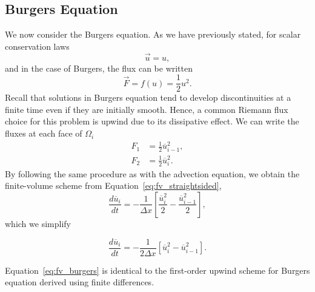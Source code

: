 \subsection{Burgers Equation}
We now consider the Burgers equation. As we have previously stated, for scalar conservation laws
\begin{equation}
 \vec{u} = u,
\end{equation}
and in the case of Burgers, the flux can be written
\begin{equation}
 \vec{F} = f(u) = \frac{1}{2} u^2.
\end{equation}
Recall that solutions in Burgers equation tend to develop discontinuities at a finite time even if they are initially smooth. Hence, a common Riemann flux choice for this problem is upwind due to its dissipative effect. We can write the fluxes at each face of $\Omega_i$
\begin{align}
 F_1 &= \frac{1}{2} \overline u_{i-1}^2, \\ 
 F_2 &= \frac{1}{2} \overline u_{i}^2.
\end{align}
By following the same procedure as with the advection equation, we obtain the finite-volume scheme from Equation~\ref{eq:fv_straightsided}, 
\begin{equation}
 \frac{d\overline u_i}{dt} = - \frac{1}{\Delta x} \left[\frac{\overline u_i^2}{2} - \frac{\overline u_{i-1}^2}{2}\right],
\end{equation}
which we simplify
\begin{eqBox}
\begin{equation}
 \frac{d\overline u_i}{dt} = - \frac{1}{2 \Delta x} \left[\overline u_i^2 - \overline u_{i-1}^2\right].
 \label{eq:fv_burgers}
\end{equation}
\end{eqBox}
Equation~\ref{eq:fv_burgers} is identical to the first-order upwind scheme for Burgers equation derived using finite differences.
